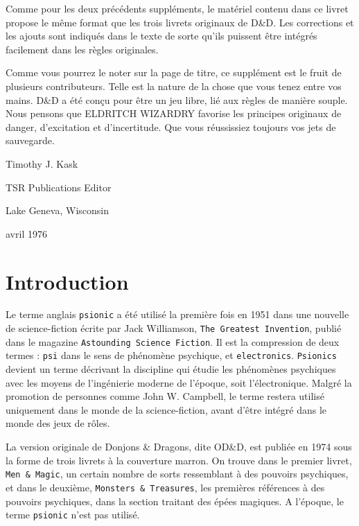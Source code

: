 \documentclass[11pt]{article}
\begin{document}
Comme pour les deux précédents suppléments, le matériel contenu dans ce livret propose le même format que les trois livrets originaux de D\&D. Les corrections et les ajouts sont indiqués dans le texte de sorte qu'ils puissent être intégrés facilement dans les règles originales.

Comme vous pourrez le noter sur la page de titre, ce supplément est le fruit de plusieurs contributeurs. Telle est la nature de la chose que vous tenez entre vos mains. D\&D a été conçu pour être un jeu libre, lié aux règles de manière souple. Nous pensons que ELDRITCH WIZARDRY favorise les principes originaux de danger, d'excitation et d'incertitude. Que vous réussissiez toujours vos jets de sauvegarde.

\vspace{1cm}

\noindent Timothy J. Kask

\noindent TSR Publications Editor

\noindent Lake Geneva, Wisconsin

 avril 1976

\newpage

\section*{Introduction}

Le terme anglais \texttt{psionic} a été utilisé la première fois en 1951 dans une nouvelle de science-fiction écrite par Jack Williamson, \texttt{The Greatest Invention}, publié dans le magazine \texttt{Astounding Science Fiction}. Il est la compression de deux termes : \texttt{psi} dans le sens de phénomène psychique, et \texttt{electronics}. \texttt{Psionics} devient un terme décrivant la discipline qui étudie les phénomènes psychiques avec les moyens de l'ingénierie moderne de l'époque, soit l'électronique. Malgré la promotion de personnes comme John W. Campbell, le terme restera utilisé uniquement dans le monde de la science-fiction, avant d'être intégré dans le monde des jeux de rôles.

La version originale de Donjons \& Dragons, dite OD\&D, est publiée en 1974 sous la forme de trois livrets à la couverture marron. On trouve dans le premier livret, \texttt{Men \& Magic}, un certain nombre de sorts ressemblant à des pouvoirs psychiques, et dans le deuxième, \texttt{Monsters \& Treasures}, les premières références à des pouvoirs psychiques, dans la section traitant des épées magiques. A l'époque, le terme \texttt{psionic} n'est pas utilisé.
\end{document}

